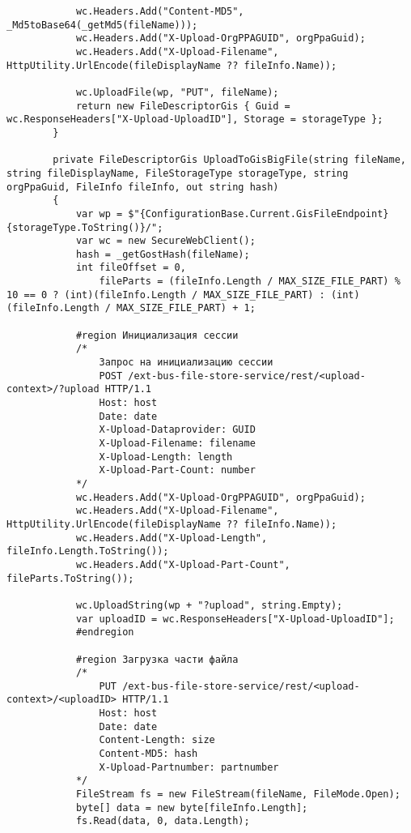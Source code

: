 \begin{lstlisting}
            wc.Headers.Add("Content-MD5", _Md5toBase64(_getMd5(fileName)));
            wc.Headers.Add("X-Upload-OrgPPAGUID", orgPpaGuid);
            wc.Headers.Add("X-Upload-Filename", HttpUtility.UrlEncode(fileDisplayName ?? fileInfo.Name));

            wc.UploadFile(wp, "PUT", fileName);
            return new FileDescriptorGis { Guid = wc.ResponseHeaders["X-Upload-UploadID"], Storage = storageType };
        }

        private FileDescriptorGis UploadToGisBigFile(string fileName, string fileDisplayName, FileStorageType storageType, string orgPpaGuid, FileInfo fileInfo, out string hash)
        {
            var wp = $"{ConfigurationBase.Current.GisFileEndpoint}{storageType.ToString()}/";
            var wc = new SecureWebClient();
            hash = _getGostHash(fileName);
            int fileOffset = 0,
                fileParts = (fileInfo.Length / MAX_SIZE_FILE_PART) % 10 == 0 ? (int)(fileInfo.Length / MAX_SIZE_FILE_PART) : (int)(fileInfo.Length / MAX_SIZE_FILE_PART) + 1;

            #region Инициализация сессии
            /*
                Запрос на инициализацию сессии
                POST /ext-bus-file-store-service/rest/<upload-context>/?upload HTTP/1.1 
                Host: host
                Date: date
                X-Upload-Dataprovider: GUID
                X-Upload-Filename: filename
                X-Upload-Length: length
                X-Upload-Part-Count: number
            */
            wc.Headers.Add("X-Upload-OrgPPAGUID", orgPpaGuid);
            wc.Headers.Add("X-Upload-Filename", HttpUtility.UrlEncode(fileDisplayName ?? fileInfo.Name));
            wc.Headers.Add("X-Upload-Length", fileInfo.Length.ToString());
            wc.Headers.Add("X-Upload-Part-Count", fileParts.ToString());

            wc.UploadString(wp + "?upload", string.Empty);
            var uploadID = wc.ResponseHeaders["X-Upload-UploadID"];
            #endregion

            #region Загрузка части файла
            /*
                PUT /ext-bus-file-store-service/rest/<upload-context>/<uploadID> HTTP/1.1
                Host: host
                Date: date
                Content-Length: size
                Content-MD5: hash
                X-Upload-Partnumber: partnumber
            */
            FileStream fs = new FileStream(fileName, FileMode.Open);
            byte[] data = new byte[fileInfo.Length];
            fs.Read(data, 0, data.Length);


\end{lstlisting}
